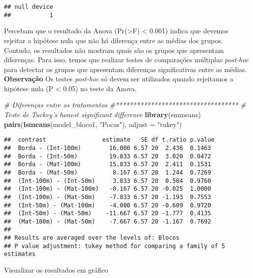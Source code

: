\documentclass[
]{book}
\newenvironment{Shaded}{\begin{snugshade}}{\end{snugshade}}
\newcommand{\CommentTok}[1]{\textcolor[rgb]{0.56,0.35,0.01}{\textit{#1}}}
\newcommand{\DataTypeTok}[1]{\textcolor[rgb]{0.13,0.29,0.53}{#1}}
\newcommand{\KeywordTok}[1]{\textcolor[rgb]{0.13,0.29,0.53}{\textbf{#1}}}
\newcommand{\NormalTok}[1]{#1}
\newcommand{\StringTok}[1]{\textcolor[rgb]{0.31,0.60,0.02}{#1}}
\begin{document}
\begin{verbatim}
## null device 
##           1
\end{verbatim}

Percebam que o resultado da Anova (Pr(\textgreater F) \textless{} 0.001) indica que devemos rejeitar a hipótese nula que não há diferença entre as médias dos grupos. Contudo, os resultados não mostram quais são os grupos que apresentam diferenças. Para isso, temos que realizar testes de comparações múltiplas \emph{post-hoc} para detectar os grupos que apresentam diferenças significativas entre as médias. \textbf{Observação} Os testes \emph{post-hoc} só devem ser utilizados quando rejeitamos a hipótese nula (P \textless{} 0.05) no teste da Anova.

\begin{Shaded}
\begin{Highlighting}[]
\CommentTok{# Diferenças entre os tratamentos}
\CommentTok{#***********************************}
\CommentTok{# Teste de Tuckey's honest significant difference}
\KeywordTok{library}\NormalTok{(emmeans)}
\KeywordTok{pairs}\NormalTok{(}\KeywordTok{lsmeans}\NormalTok{(model_bloco1, }\StringTok{"Pocas"}\NormalTok{), }\DataTypeTok{adjust =} \StringTok{"tukey"}\NormalTok{)}
\end{Highlighting}
\end{Shaded}

\begin{verbatim}
##  contrast                estimate   SE df t.ratio p.value
##  Borda - (Int-100m)        16.000 6.57 20  2.436  0.1463 
##  Borda - (Int-50m)         19.833 6.57 20  3.020  0.0472 
##  Borda - (Mat-100m)        15.833 6.57 20  2.411  0.1531 
##  Borda - (Mat-50m)          8.167 6.57 20  1.244  0.7269 
##  (Int-100m) - (Int-50m)     3.833 6.57 20  0.584  0.9760 
##  (Int-100m) - (Mat-100m)   -0.167 6.57 20 -0.025  1.0000 
##  (Int-100m) - (Mat-50m)    -7.833 6.57 20 -1.193  0.7553 
##  (Int-50m) - (Mat-100m)    -4.000 6.57 20 -0.609  0.9720 
##  (Int-50m) - (Mat-50m)    -11.667 6.57 20 -1.777  0.4135 
##  (Mat-100m) - (Mat-50m)    -7.667 6.57 20 -1.167  0.7692 
## 
## Results are averaged over the levels of: Blocos 
## P value adjustment: tukey method for comparing a family of 5 estimates
\end{verbatim}

Visualizar os resultados em gráfico
\end{document}

